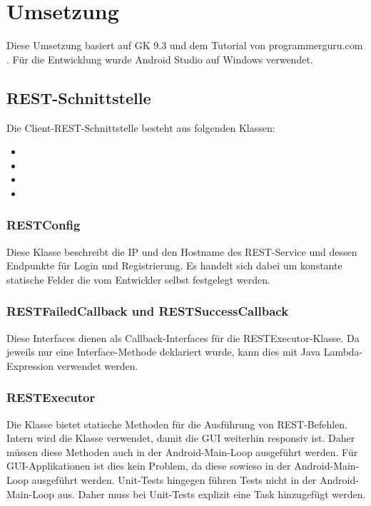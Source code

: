 
\section{Umsetzung}

Diese Umsetzung basiert auf GK 9.3 und dem Tutorial von programmerguru.com \cite{programmerguru-online}. Für die Entwicklung wurde Android Studio auf Windows verwendet. 

\subsection{REST-Schnittstelle}
Die Client-REST-Schnittstelle besteht aus folgenden Klassen:
\begin{itemize}
	\item {}
	\item {}
	\item {}
	\item {}
\end{itemize}

\subsubsection{RESTConfig}
Diese Klasse beschreibt die IP und den Hostname des REST-Service und dessen Endpunkte für Login und Registrierung. Es handelt sich dabei um konstante statische Felder die vom Entwickler selbst festgelegt werden.

\subsubsection{RESTFailedCallback und RESTSuccessCallback}
Diese Interfaces dienen als Callback-Interfaces für die RESTExecutor-Klasse. Da jeweils nur eine Interface-Methode deklariert wurde, kann dies mit Java Lambda-Expression verwendet werden.

\subsubsection{RESTExecutor}
Die Klasse  bietet statische Methoden für die Ausführung von REST-Befehlen. Intern wird die Klasse  verwendet, damit die GUI weiterhin responsiv ist. Daher müssen diese Methoden auch in der Android-Main-Loop ausgeführt werden. Für GUI-Applikationen ist dies kein Problem, da diese sowieso in der Android-Main-Loop ausgeführt werden. Unit-Tests hingegen führen Tests nicht in der Android-Main-Loop aus. Daher muss bei Unit-Tests explizit eine Task hinzugefügt werden.



